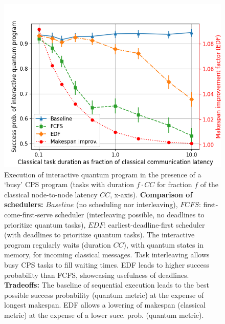 \begin{figure}%
    \centering
    \includegraphics[width=1.0\columnwidth]{figures/qoala/tradeoffs_cq.png}
    \caption{Execution of interactive quantum program in the presence of a `busy' CPS program (tasks with duration $f \cdot CC$ for fraction $f$ of the classical node-to-node latency $CC$, x-axis).
    \textbf{Comparison of schedulers:}
    $Baseline$ (no scheduling nor interleaving),
    $FCFS$: first-come-first-serve scheduler (interleaving possible, no deadlines to prioritize quantum tasks),
    $EDF$: earliest-deadline-first scheduler (with deadlines to prioritize quantum tasks).
    The interactive program regularly waits (duration $CC$), with quantum states in memory, for incoming classical messages. %
    Task interleaving allows busy CPS tasks to fill waiting times.
    EDF leads to higher success probability than FCFS, showcasing usefulness of deadlines.
    \textbf{Tradeoffs:}
    The baseline of sequential execution leads to the best possible success probability (quantum metric) at the expense of longest makespan. EDF allows a lowering of makespan (classical metric) at the expense of a lower succ. prob. (quantum metric). 
    }
    \label{fig:eval_tradeoffs_cq}
\end{figure}

